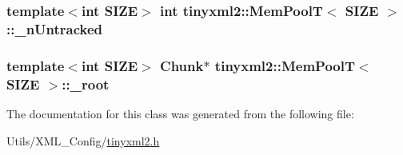 \hypertarget{classtinyxml2_1_1_mem_pool_t_aca9adac3f7ce44a132dc00c285566b1e}{
\subsubsection[{\-\_\-n\-Untracked}]{\setlength{\rightskip}{0pt plus 5cm}template$<$int S\-I\-Z\-E$>$ int {\bf tinyxml2\-::\-Mem\-Pool\-T}$<$ S\-I\-Z\-E $>$\-::\-\_\-n\-Untracked\hspace{0.3cm}{\ttfamily [private]}}}\label{classtinyxml2_1_1_mem_pool_t_aca9adac3f7ce44a132dc00c285566b1e}
\hypertarget{classtinyxml2_1_1_mem_pool_t_af203dc16256d7631fcbedd87864390bb}{
\subsubsection[{\-\_\-root}]{\setlength{\rightskip}{0pt plus 5cm}template$<$int S\-I\-Z\-E$>$ {\bf Chunk}$\ast$ {\bf tinyxml2\-::\-Mem\-Pool\-T}$<$ S\-I\-Z\-E $>$\-::\-\_\-root\hspace{0.3cm}{\ttfamily [private]}}}\label{classtinyxml2_1_1_mem_pool_t_af203dc16256d7631fcbedd87864390bb}


The documentation for this class was generated from the following file\-:\begin{DoxyCompactItemize}
\item 
Utils/\-X\-M\-L\-\_\-\-Config/\hyperlink{tinyxml2_8h}{tinyxml2.\-h}\end{DoxyCompactItemize}
